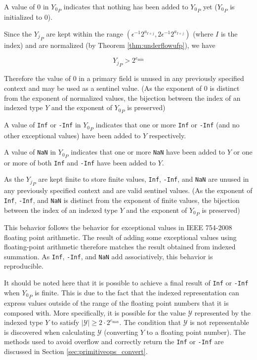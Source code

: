 \documentclass[12pt]{article}
\providecommand{\min}{\ensuremath{\text{min}}}
\providecommand{\max}{\ensuremath{\text{max}}}
\theoremstyle{definition}
\numberwithin{equation}{section}
\numberwithin{figure}{section}
\begin{document}
      A value of $0$ in ${Y_0}_P$ indicates that nothing has been added to ${Y_0}_P$ yet (${Y_0}_P$ is initialized to $0$).

      Since the ${Y_j}_P$ are kept within the range $(\epsilon^{-1}  2^{a_{I + j}}, 2  \epsilon^{-1}  2^{a_{I + j}})$ (where $I$ is the index) and are normalized (by Theorem \ref{thm:underflowufp}), we have

      \begin{equation*}
        {Y_j}_P > 2^{e_{\min}}
      \end{equation*}

      Therefore the value of $0$ in a primary field is unused in any previously specified context and may be used as a sentinel value. (As the exponent of $0$ is distinct from the exponent of normalized values, the bijection between the index of an indexed type $Y$ and the exponent of ${Y_0}_P$ is preserved)

      A value of \texttt{Inf} or \texttt{-Inf} in ${Y_0}_P$ indicates that one or more \texttt{Inf} or \texttt{-Inf} (and no other exceptional values) have been added to $Y$ respectively.

      A value of \texttt{NaN} in ${Y_0}_P$ indicates that one or more \texttt{NaN} have been added to $Y$ or one or more of both \texttt{Inf} and \texttt{-Inf} have been added to $Y$.

      As the ${Y_j}_P$ are kept finite to store finite values, \texttt{Inf}, \texttt{-Inf}, and \texttt{NaN} are unused in any previously specified context and are valid sentinel values. (As the exponent of \texttt{Inf}, \texttt{-Inf}, and \texttt{NaN} is distinct from the exponent of finite values, the bijection between the index of an indexed type $Y$ and the exponent of ${Y_0}_P$ is preserved)

      This behavior follows the behavior for exceptional values in IEEE 754-2008 floating point arithmetic. The result of adding some exceptional values using floating-point arithmetic therefore matches the result obtained from indexed summation. As \texttt{Inf}, \texttt{-Inf}, and \texttt{NaN} add associatively, this behavior is reproducible.

      It should be noted here that it is possible to achieve a final result of \texttt{Inf} or \texttt{-Inf} when ${Y_0}_P$ is finite. This is due to the fact that the indexed representation can express values outside of the range of the floating point numbers that it is composed with. More specifically, it is possible for the value $\mathcal{Y}$ represented by the indexed type $Y$ to satisfy $|\mathcal{Y}| \geq 2 \cdot 2^{e_{\max}}$. The condition that $\mathcal{Y}$ is not representable is discovered when calculating $\mathcal{Y}$ (converting $Y$ to a floating point number). The methods used to avoid overflow and correctly return the \texttt{Inf} or \texttt{-Inf} are discussed in Section \ref{sec:primitiveops_convert}.
\end{document}
